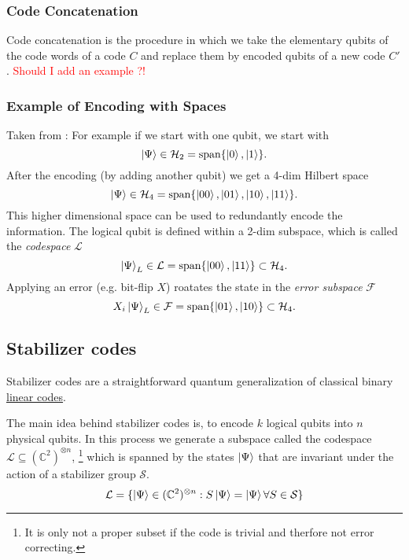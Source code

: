 \subsubsection{Code Concatenation}
Code concatenation is the procedure in which we take the elementary qubits of the code words of a code $C$ and replace them by encoded qubits of a new code $C'$. \cite{QECmemory}
\textcolor{red}{Should I add an example ?!}


\subsubsection{Example of Encoding with Spaces}
Taken from \cite{QECintro}: 
For example if we start with one qubit, we start with 
\begin{equation}
    \ket{\Psi} \in \mathcal{H}_2 = \text{span}\{\ket{0},\ket{1} \}.
\end{equation}
After the encoding (by adding another qubit) we get a 4-dim Hilbert space 
\begin{equation}
    \ket{\Psi} \in \mathcal{H}_4 = \text{span}\{\ket{00},\ket{01},\ket{10},\ket{11} \}.
\end{equation}
This higher dimensional space can be used to redundantly encode the information.
The logical qubit is defined within a 2-dim subspace, which is called the \textit{codespace} $\mathcal{L}$
\begin{equation}
    \ket{\Psi}_L \in \mathcal{L} = \text{span}\{\ket{00},\ket{11} \} \subset \mathcal{H}_4.
\end{equation}
Applying an error (e.g. bit-flip $X$) roatates the state in the \textit{error subspace} $\mathcal{F}$
\begin{equation}
    X_i \ket{\Psi}_L \in \mathcal{F} = \text{span}\{\ket{01},\ket{10} \} \subset \mathcal{H}_4.
\end{equation} 


\subsection{Stabilizer codes}\label{sec:basic.qc.stabilizer}
Stabilizer codes are a straightforward quantum generalization of classical binary \hyperref[sec:basic.math.linear_codes]{linear codes}. \cite{QECmemory}

The main idea behind stabilizer codes is, to encode $k$ logical qubits into $n$ physical qubits.
In this process we generate a subspace called the codespace $\mathcal{L} \subseteq (\mathbb{C}^2)^{\otimes n}$,
\footnote{It is only not a proper subset if the code is trivial and therfore not error correcting.}
which is spanned by the states $\ket{\Psi}$ that are invariant under the action of a stabilizer group $\mathcal{S}$. \cite{QECmemory}
\begin{equation}
    \mathcal{L} = \{ \ket{\Psi} \in (\mathbb{C}^2)^{\otimes n}: S\ket{\Psi}=\ket{\Psi}  \forall S \in \mathcal{S}\}
\end{equation}

